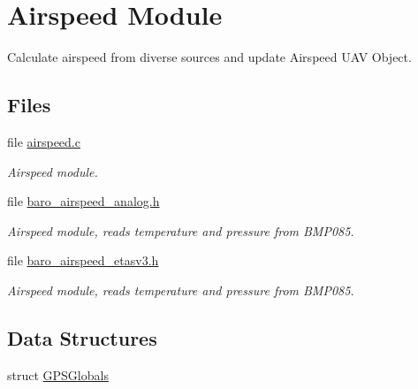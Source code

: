 \hypertarget{group___airspeed_module}{\section{Airspeed Module}
\label{group___airspeed_module}
}


Calculate airspeed from diverse sources and update Airspeed U\-A\-V Object.  


\subsection*{Files}
\begin{DoxyCompactItemize}
\item 
file \hyperlink{airspeed_8c}{airspeed.\-c}
\begin{DoxyCompactList}\small\item\em Airspeed module. \end{DoxyCompactList}\item 
file \hyperlink{baro__airspeed__analog_8h}{baro\-\_\-airspeed\-\_\-analog.\-h}
\begin{DoxyCompactList}\small\item\em Airspeed module, reads temperature and pressure from B\-M\-P085. \end{DoxyCompactList}\item 
file \hyperlink{baro__airspeed__etasv3_8h}{baro\-\_\-airspeed\-\_\-etasv3.\-h}
\begin{DoxyCompactList}\small\item\em Airspeed module, reads temperature and pressure from B\-M\-P085. \end{DoxyCompactList}\end{DoxyCompactItemize}
\subsection*{Data Structures}
\begin{DoxyCompactItemize}
\item 
struct \hyperlink{struct_g_p_s_globals}{G\-P\-S\-Globals}
\end{DoxyCompactItemize}
